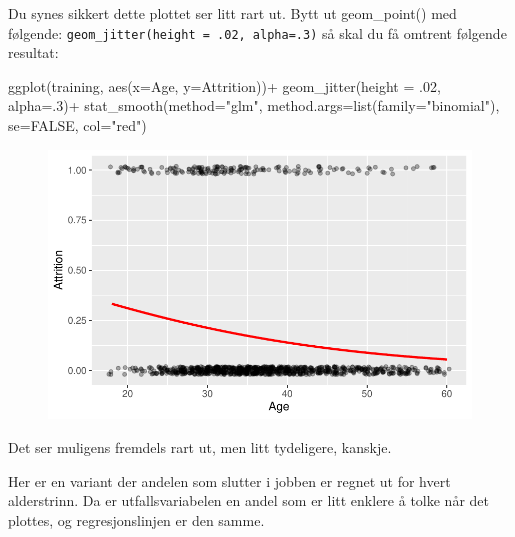\documentclass[
  letterpaper,
  DIV=11,
  numbers=noendperiod]{scrreprt}
\newenvironment{Shaded}{\begin{snugshade}}{\end{snugshade}}
\newcommand{\AttributeTok}[1]{\textcolor[rgb]{0.40,0.45,0.13}{#1}}
\newcommand{\ConstantTok}[1]{\textcolor[rgb]{0.56,0.35,0.01}{#1}}
\newcommand{\DecValTok}[1]{\textcolor[rgb]{0.68,0.00,0.00}{#1}}
\newcommand{\FunctionTok}[1]{\textcolor[rgb]{0.28,0.35,0.67}{#1}}
\newcommand{\NormalTok}[1]{\textcolor[rgb]{0.00,0.23,0.31}{#1}}
\newcommand{\SpecialCharTok}[1]{\textcolor[rgb]{0.37,0.37,0.37}{#1}}
\newcommand{\StringTok}[1]{\textcolor[rgb]{0.13,0.47,0.30}{#1}}
\theoremstyle{definition}
\theoremstyle{remark}
\begin{document}
Du synes sikkert dette plottet ser litt rart ut. Bytt ut geom\_point()
med følgende: \texttt{geom\_jitter(height\ =\ .02,\ alpha=.3)} så skal
du få omtrent følgende resultat:

\begin{Shaded}
\begin{Highlighting}[]
\FunctionTok{ggplot}\NormalTok{(training, }\FunctionTok{aes}\NormalTok{(}\AttributeTok{x=}\NormalTok{Age, }\AttributeTok{y=}\NormalTok{Attrition))}\SpecialCharTok{+} 
  \FunctionTok{geom\_jitter}\NormalTok{(}\AttributeTok{height =}\NormalTok{ .}\DecValTok{02}\NormalTok{, }\AttributeTok{alpha=}\NormalTok{.}\DecValTok{3}\NormalTok{)}\SpecialCharTok{+} 
  \FunctionTok{stat\_smooth}\NormalTok{(}\AttributeTok{method=}\StringTok{"glm"}\NormalTok{, }\AttributeTok{method.args=}\FunctionTok{list}\NormalTok{(}\AttributeTok{family=}\StringTok{"binomial"}\NormalTok{), }\AttributeTok{se=}\ConstantTok{FALSE}\NormalTok{, }\AttributeTok{col=}\StringTok{"red"}\NormalTok{) }
\end{Highlighting}
\end{Shaded}

\begin{figure}[H]

{\centering \includegraphics{./logistisk_regresjon_files/figure-pdf/unnamed-chunk-10-1.pdf}

}

\end{figure}

Det ser muligens fremdels rart ut, men litt tydeligere, kanskje.

Her er en variant der andelen som slutter i jobben er regnet ut for
hvert alderstrinn. Da er utfallsvariabelen en andel som er litt enklere
å tolke når det plottes, og regresjonslinjen er den samme.
\end{document}
